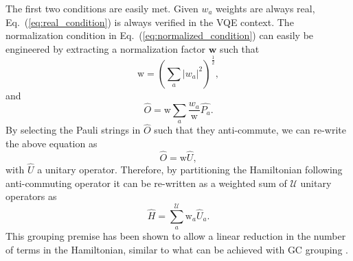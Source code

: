 The first two conditions are easily met. Given $w_a$ weights are always real, Eq.~(\ref{eq:real_condition}) is always verified in the VQE context. The normalization condition in Eq.~(\ref{eq:normalized_condition}) can easily be engineered by extracting a normalization factor $\boldsymbol{w}$ such that 
\begin{equation}
    \mathrm{w} = \left( \sum_a |w_a|^2 \right)^{\frac{1}{2}}, 
\end{equation}
and
\begin{equation}
    \hat{O} = \mathrm{w} \sum_{a} \frac{w_{a}}{\mathrm{w}} \hat{P_{a}}.
\end{equation}
By selecting the Pauli strings in $\hat{O}$ such that they anti-commute, we can re-write the above equation as 
\begin{equation}
    \hat{O} = \mathrm{w} \hat{U},
\end{equation}
with $\hat{U}$ a unitary operator. Therefore, by partitioning the Hamiltonian following anti-commuting operator it can be re-written as a weighted sum of $\mathcal{U}$ unitary operators as 
\begin{equation} \label{eq:unitary_hamiltonian}
    \hat{H} = \sum_a^{\mathcal{U}} \mathrm{w}_a \hat{U}_a.
\end{equation}
This grouping premise has been shown to allow a linear reduction in the number of terms in the Hamiltonian, similar to what can be achieved with GC grouping \cite{Izmaylov2020a, Zhao2020, Ralli2021}.

